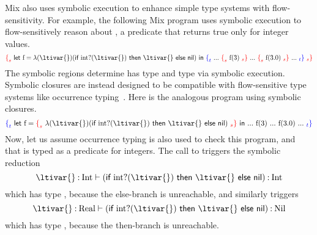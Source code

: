 Mix also uses symbolic execution to enhance simple type systems with flow-sensitivity.
For example, the following Mix program uses symbolic execution 
to flow-sensitively reason about , a predicate that returns true only for integer values.
%
\[
\MixSregion{\ltilet{\text{f}}{\ltiufun{\ltivar{}}{(\ltiif{\ltiapp{\text{int?}}{\ltivar{}}}{\ltivar{}}{\textsf{nil}})}}
                  {\MixTregion{  ...\ \MixSregion{\ltiapp{\text{f}}{3}}
                               \ ...\ \MixSregion{\ltiapp{\text{f}}{3.0}}
                               \ ... }}}
\]
%
The symbolic regions determine
 has type  and
 type  via symbolic execution.
Symbolic closures are instead designed to be compatible with flow-sensitive type systems like occurrence typing~\cite{TF10}.
Here is the analogous program using symbolic closures.
%
\[
\MixTregion{\ltilet{\text{f}}{\MixSregion{\ltiufun{\ltivar{}}{(\ltiif{\ltiapp{\text{int?}}{\ltivar{}}}{\ltivar{}}{\textsf{nil}})}}}
                  {  ...\ {\ltiapp{\text{f}}{3}}
                               \ ...\ {\ltiapp{\text{f}}{3.0}}
                               \ ... }}
\]
%
Now, let us assume occurrence typing is also used to check this program, and
that  is typed as a predicate for integers.
The call to
{}
triggers the symbolic reduction
%
\[
\ltitjudgementNoElab{\hastype{\ltivar{}}{\text{Int}}}
                    {(\ltiif{\ltiapp{\text{int?}}{\ltivar{}}}{\ltivar{}}{\textsf{nil}})}
                    {\text{Int}}
\]
%
which has type , because the else-branch is unreachable, and 
similarly {} triggers
%
\[
\ltitjudgementNoElab{\hastype{\ltivar{}}{\text{Real}}}
                    {(\ltiif{\ltiapp{\text{int?}}{\ltivar{}}}{\ltivar{}}{\textsf{nil}})}
                    {\text{Nil}}
\]
%
which has type , because the then-branch is unreachable.





